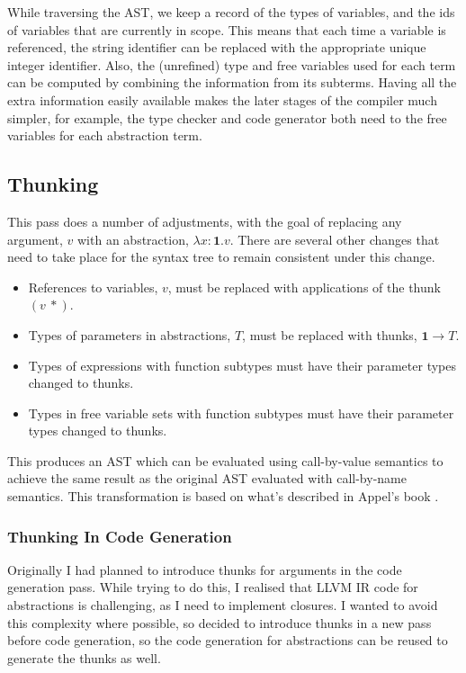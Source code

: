 While traversing the AST, we keep a record of the types of variables, and the ids of variables that are currently
in scope.
This means that each time a variable is referenced, the string identifier can be replaced with the appropriate
unique integer identifier.
Also, the (unrefined) type and free variables used for each term can be computed by combining
the information from its subterms.
Having all the extra information easily available makes the later stages of the compiler much simpler,
for example, the type checker and code generator both need to the free variables for each abstraction term.

\subsection{Thunking}

This pass does a number of adjustments, with the goal of replacing any argument, $v$ with an abstraction,
$\lambda x: \textbf{1} . v$.
There are several other changes that need to take place for the syntax tree to remain consistent under this
change.
\begin{itemize}
    \item References to variables, $v$, must be replaced with applications of the thunk $(v\ \ast)$.
    \item Types of parameters in abstractions, $T$, must be replaced with thunks, $\textbf{1} \rightarrow T$.
    \item Types of expressions with function subtypes must have their parameter types changed to thunks.
    \item Types in free variable sets with function subtypes must have their parameter types changed to thunks.
\end{itemize}
This produces an AST which can be evaluated using call-by-value semantics to achieve the same result as
the original AST evaluated with call-by-name semantics.
This transformation is based on what's described in Appel's book \cite{appel1998}.

\subsubsection{Thunking In Code Generation}

Originally I had planned to introduce thunks for arguments in the code generation pass.
While trying to do this, I realised that LLVM IR code for abstractions is challenging, as I need to
implement closures.
I wanted to avoid this complexity where possible, so decided to introduce thunks in a new pass before
code generation, so the code generation for abstractions can be reused to generate the thunks as well.

